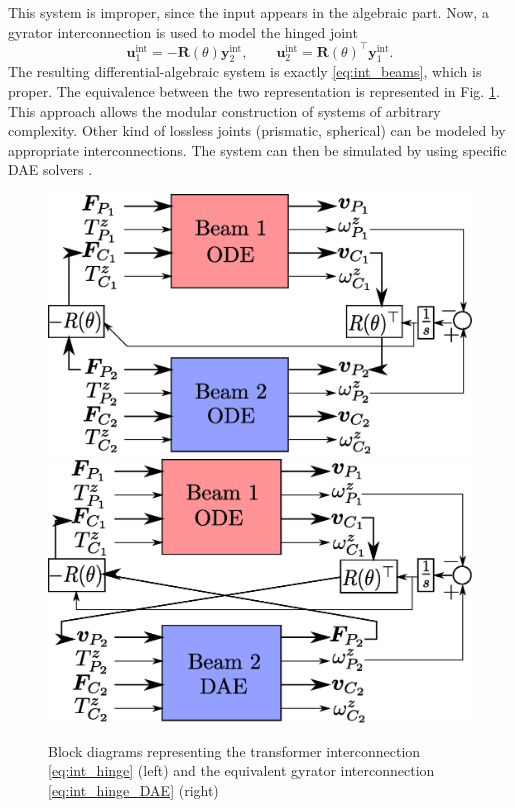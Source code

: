 \documentclass{svjour3}                     %
\begin{document}
	This system is improper, since the input appears in the algebraic part. Now, a gyrator interconnection is used to model the hinged joint
	\begin{equation}
	\label{eq:int_hinge_DAE}
	\mathbf{u}_1^{\text{int}} = -\mathbf{R}(\theta) \mathbf{y}_2^{\text{int}}, \qquad
	\mathbf{u}_2^{\text{int}} = \mathbf{R}(\theta)^\top \mathbf{y}_1^{\text{int}}.
	\end{equation}
	The resulting differential-algebraic system is exactly \eqref{eq:int_beams}, which is proper. The equivalence between the two representation is represented in Fig. \ref{fig:beam_int_block}. This approach allows the modular construction of systems of arbitrary complexity. Other kind of lossless joints (prismatic, spherical) can be modeled by appropriate interconnections. The system can then be simulated by using specific DAE solvers \cite{daePetzold}. 
	
	\begin{figure}[t]
		\centering
		\includegraphics[height=0.16\textheight]{block_hinged_beam.eps} \hspace{.5cm}
		\includegraphics[height=0.16\textheight]{block_hinged_beam_DAE.eps} 	
		\caption{Block diagrams representing the transformer interconnection \eqref{eq:int_hinge} (left) and the equivalent gyrator interconnection \eqref{eq:int_hinge_DAE} (right)}
		\label{fig:beam_int_block}
	\end{figure}
	
\end{document}
